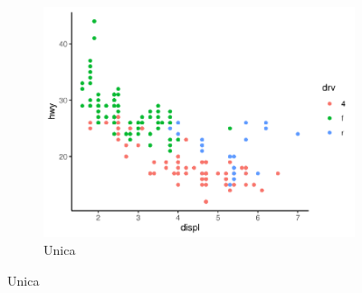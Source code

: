\begin{figure}[!h]
\begin{subfigure}{\linewidth}
	\end{subfigure}
\end{figure}

\lipsum[1-10]

\begin{figure}
\begin{subfigure}{\linewidth}
		\caption{Unica}
		\includegraphics{fig/plot}
\end{subfigure}
\end{figure}
